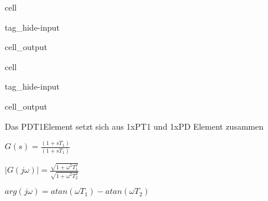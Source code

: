 \documentclass[letterpaper,10pt,english]{jupyterBook}
\begin{document}
\begin{sphinxuseclass}{cell}
\begin{sphinxuseclass}{tag_hide-input}\begin{sphinxVerbatimOutput}

\begin{sphinxuseclass}{cell_output}
\noindent{}

\end{sphinxuseclass}\end{sphinxVerbatimOutput}

\end{sphinxuseclass}
\end{sphinxuseclass}
\begin{sphinxuseclass}{cell}
\begin{sphinxuseclass}{tag_hide-input}\begin{sphinxVerbatimOutput}

\begin{sphinxuseclass}{cell_output}
\noindent{}

\end{sphinxuseclass}\end{sphinxVerbatimOutput}

\end{sphinxuseclass}
\end{sphinxuseclass}
\begin{DUlineblock}{0em}
\item[] 
\end{DUlineblock}

\sphinxAtStartPar
Das PDT1\sphinxhyphen{}Element setzt sich aus 1xPT1 und 1xPD \sphinxhyphen{}Element zusammen

\sphinxAtStartPar
\(G(s) = \frac{\left(1+sT_1\right)}{\left(1+sT_1\right)}\)

\sphinxAtStartPar
\(|G(j\omega)| = \frac{\sqrt{1+\omega^2T_1^2}}{\sqrt{1 + \omega^2T_2^2}}\)

\sphinxAtStartPar
\(arg(j\omega) = atan(\omega T_1) - atan(\omega T_2)\)
\end{document}
